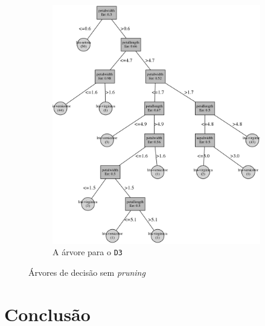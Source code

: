 \documentclass[12pt,a4paper,oneside]{article}
\begin{document}
\begin{figure}[!htb]
  \begin{subfigure}[b]{0.90\textwidth}
    \centering
    \includegraphics[scale=0.2]{arv3}
    \caption{A árvore para o \texttt{D3}}
    \label{fig:ad3}
  \end{subfigure}
  \caption{Árvores de decisão sem \textit{pruning}}
  \label{fig:anp}
\end{figure}

\lipsum[3]

\lipsum[4]

\lipsum[5]



\section{Conclusão}
\label{sec:con}


\lipsum[0]

\lipsum[1]

\lipsum[2]




\end{document}
